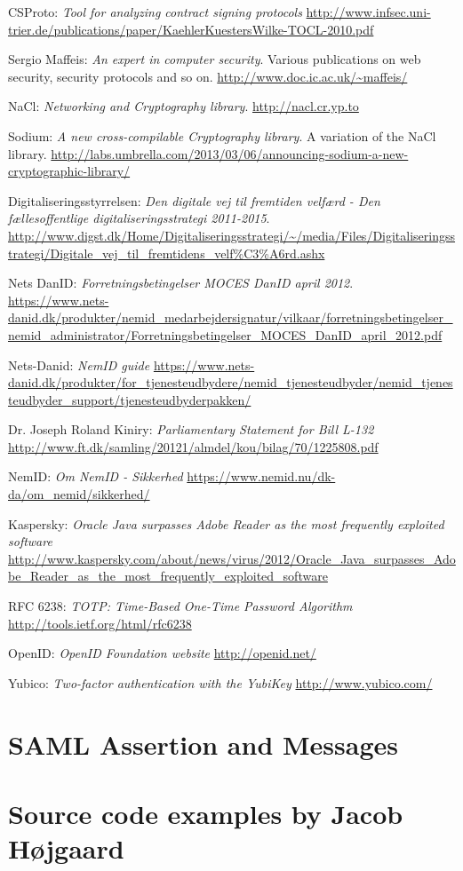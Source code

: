 \documentclass[twosided]{report}
\begin{document}
\begin{thebibliography}{9}
 CSProto:
 \emph{Tool for analyzing contract signing protocols}
 \url{http://www.infsec.uni-trier.de/publications/paper/KaehlerKuestersWilke-TOCL-2010.pdf}

 Sergio Maffeis:
 \emph{An expert in computer security}.
 Various publications on web security, security protocols and so on.
 \url{http://www.doc.ic.ac.uk/~maffeis/}

 NaCl:
 \emph{Networking and Cryptography library}.
 \url{http://nacl.cr.yp.to}

 Sodium:
 \emph{A new cross-compilable Cryptography library}.
 A variation of the NaCl library.
 \url{http://labs.umbrella.com/2013/03/06/announcing-sodium-a-new-cryptographic-library/}

 Digitaliseringsstyrrelsen:
 \emph{Den digitale vej til fremtiden velf{\ae}rd - Den f{\ae}llesoffentlige digitaliseringsstrategi 2011-2015}.
 \url{http://www.digst.dk/Home/Digitaliseringsstrategi/~/media/Files/Digitaliseringsstrategi/Digitale_vej_til_fremtidens_velf\%C3\%A6rd.ashx}

 Nets DanID:
 \emph{Forretningsbetingelser MOCES DanID april 2012}.
 \url{https://www.nets-danid.dk/produkter/nemid_medarbejdersignatur/vilkaar/forretningsbetingelser_nemid_administrator/Forretningsbetingelser_MOCES_DanID_april_2012.pdf}

 Nets-Danid:
 \emph{NemID guide}
 \url{https://www.nets-danid.dk/produkter/for_tjenesteudbydere/nemid_tjenesteudbyder/nemid_tjenesteudbyder_support/tjenesteudbyderpakken/}

 Dr. Joseph Roland Kiniry:
 \emph{Parliamentary Statement for Bill L-132}
 \url{http://www.ft.dk/samling/20121/almdel/kou/bilag/70/1225808.pdf}

 NemID:
 \emph{Om NemID - Sikkerhed}
 \url{https://www.nemid.nu/dk-da/om_nemid/sikkerhed/}

 Kaspersky:
 \emph{Oracle Java surpasses Adobe Reader as the most frequently exploited software}
 \url{http://www.kaspersky.com/about/news/virus/2012/Oracle_Java_surpasses_Adobe_Reader_as_the_most_frequently_exploited_software}

 RFC 6238:
 \emph{TOTP: Time-Based One-Time Password Algorithm}
 \url{http://tools.ietf.org/html/rfc6238}

 OpenID:
 \emph{OpenID Foundation website}
 \url{http://openid.net/}

 Yubico:
 \emph{Two-factor authentication with the YubiKey}
 \url{http://www.yubico.com/}

\end{thebibliography}

\appendix
\chapter{SAML Assertion and Messages}

\chapter{Source code examples by Jacob H{\o}jgaard}
\end{document}
